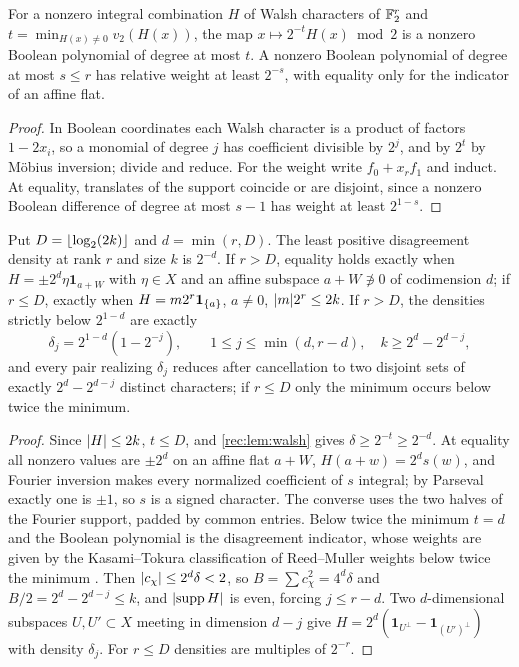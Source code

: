 \begin{lemma}\label{rec:lem:walsh}
For a nonzero integral combination $H$ of Walsh characters of $\mathbb{F}_2^r$ and $t=\min_{H(x)\ne0}v_2(H(x))$, the map
$x\mapsto2^{-t}H(x)\bmod2$ is a nonzero Boolean polynomial of degree at most $t$. A nonzero Boolean
polynomial of degree at most $s\le r$ has relative weight at least $2^{-s}$, with equality only for the
indicator of an affine flat.
\end{lemma}

\begin{proof}
In Boolean coordinates each Walsh character is a product of factors $1-2x_i$, so a monomial of degree
$j$ has coefficient divisible by $2^j$, and by $2^t$ by M\"obius inversion; divide and reduce. For the
weight write $f_0+x_rf_1$ and induct. At equality, translates of the support coincide or are
disjoint, since a nonzero Boolean difference of degree at most $s-1$ has weight at least $2^{1-s}$.
\end{proof}

\begin{theorem}\label{rec:thm:qmatch}
Put $D=\lfloor\log_2(2k)\rfloor$ and $d=\min(r,D)$. The least positive disagreement density at rank $r$ and size
$k$ is $2^{-d}$. If $r>D$, equality holds exactly when $H=\pm2^d\eta\mathbf 1_{a+W}$ with $\eta\in X$ and an affine
subspace $a+W\not\ni0$ of codimension $d$; if $r\le D$, exactly when $H=m2^r\mathbf 1_{\{a\}}$, $a\ne0$, $\lvert m\rvert2^r\le2k$.
If $r>D$, the densities strictly below $2^{1-d}$ are exactly
\[
 \delta_j=2^{1-d}(1-2^{-j}),\qquad1\le j\le\min(d,r-d),\quad k\ge2^d-2^{d-j},
\]
and every pair realizing $\delta_j$ reduces after cancellation to two disjoint sets of exactly $2^d-2^{d-j}$
distinct characters; if $r\le D$ only the minimum occurs below twice the minimum.
\end{theorem}

\begin{proof}
Since $\lvert H\rvert\le2k$, $t\le D$, and \cref{rec:lem:walsh} gives $\delta\ge2^{-t}\ge2^{-d}$. At equality all nonzero values
are $\pm2^d$ on an affine flat $a+W$, $H(a+w)=2^ds(w)$, and Fourier inversion makes every normalized
coefficient of $s$ integral; by Parseval exactly one is $\pm1$, so $s$ is a signed character. The
converse uses the two halves of the Fourier support, padded by common entries. Below twice the
minimum $t=d$ and the Boolean polynomial is the disagreement indicator, whose weights are given by
the Kasami--Tokura classification of Reed--Muller weights below twice the minimum
\cite{KasamiTokura1970Weight}. Then $\lvert c_\chi\rvert\le2^d\delta<2$, so $B=\sum c_\chi^2=4^d\delta$ and $B/2=2^d-2^{d-j}\le k$, and
$\lvert\operatorname{supp} H\rvert$ is even, forcing $j\le r-d$. Two $d$-dimensional subspaces $U,U'\subset X$ meeting in dimension $d-j$
give $H=2^d(\mathbf 1_{U^\perp}-\mathbf 1_{(U')^\perp})$ with density $\delta_j$. For $r\le D$ densities are multiples of $2^{-r}$.
\end{proof}

